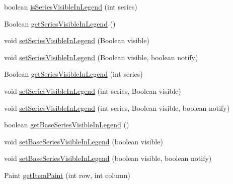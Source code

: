 \begin{DoxyCompactItemize}
boolean \mbox{\hyperlink{interfaceorg_1_1jfree_1_1chart_1_1renderer_1_1category_1_1_category_item_renderer_a24e073dff573e5ebc13bfafc81c9bfc5}{is\+Series\+Visible\+In\+Legend}} (int series)
\item 
Boolean \mbox{\hyperlink{interfaceorg_1_1jfree_1_1chart_1_1renderer_1_1category_1_1_category_item_renderer_a702f01f7f6b883405e393e74ea16a129}{get\+Series\+Visible\+In\+Legend}} ()
\item 
void \mbox{\hyperlink{interfaceorg_1_1jfree_1_1chart_1_1renderer_1_1category_1_1_category_item_renderer_a2deadd4021ffd277afe59346746efd08}{set\+Series\+Visible\+In\+Legend}} (Boolean visible)
\item 
void \mbox{\hyperlink{interfaceorg_1_1jfree_1_1chart_1_1renderer_1_1category_1_1_category_item_renderer_af93a5e919792a50b46862bf36fb026d1}{set\+Series\+Visible\+In\+Legend}} (Boolean visible, boolean notify)
\item 
Boolean \mbox{\hyperlink{interfaceorg_1_1jfree_1_1chart_1_1renderer_1_1category_1_1_category_item_renderer_aece9d12305e2ae6e3ef96d3981574810}{get\+Series\+Visible\+In\+Legend}} (int series)
\item 
void \mbox{\hyperlink{interfaceorg_1_1jfree_1_1chart_1_1renderer_1_1category_1_1_category_item_renderer_a49a49aaa13e05a123ae9808c3f0cb5c8}{set\+Series\+Visible\+In\+Legend}} (int series, Boolean visible)
\item 
void \mbox{\hyperlink{interfaceorg_1_1jfree_1_1chart_1_1renderer_1_1category_1_1_category_item_renderer_a94643e3f2d9e76532894b39b34b80575}{set\+Series\+Visible\+In\+Legend}} (int series, Boolean visible, boolean notify)
\item 
boolean \mbox{\hyperlink{interfaceorg_1_1jfree_1_1chart_1_1renderer_1_1category_1_1_category_item_renderer_a5dbb34f875d6bbd46e99e3ec0d06f27c}{get\+Base\+Series\+Visible\+In\+Legend}} ()
\item 
void \mbox{\hyperlink{interfaceorg_1_1jfree_1_1chart_1_1renderer_1_1category_1_1_category_item_renderer_a2581902144013c603baed487e99eb7bd}{set\+Base\+Series\+Visible\+In\+Legend}} (boolean visible)
\item 
void \mbox{\hyperlink{interfaceorg_1_1jfree_1_1chart_1_1renderer_1_1category_1_1_category_item_renderer_a363fe4de50faa1bd160fd45979157be1}{set\+Base\+Series\+Visible\+In\+Legend}} (boolean visible, boolean notify)
\item 
Paint \mbox{\hyperlink{interfaceorg_1_1jfree_1_1chart_1_1renderer_1_1category_1_1_category_item_renderer_a535682d438117db613e8e0840fb1d7bd}{get\+Item\+Paint}} (int row, int column)

\end{DoxyCompactItemize}
